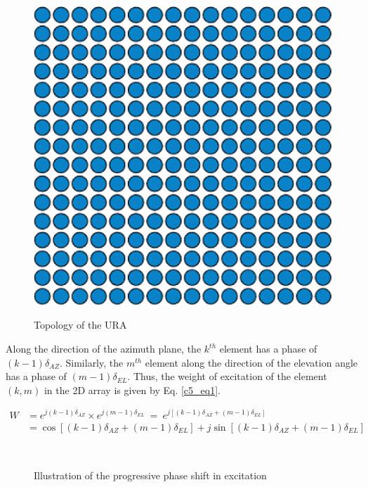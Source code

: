 \begin{figure}
  \centering
  \includegraphics[width=0.4\linewidth]{Fig-naun_1.eps}\\
  \caption{Topology of the URA} \label{fig_5_1}
\end{figure}

Along the direction of the azimuth plane, the $k^{th}$ element has a phase of $(k-1)\delta_{AZ}$. Similarly, the $m^{th}$ element along the direction of the elevation angle has a phase of $(m-1)\delta_{EL}$. Thus, the weight of excitation of the element $(k, m)$ in the 2D array is given by Eq. \ref{c5_eq1}.

\begin{equation}\label{c5_eq1}
\begin{split}
W & = e^{j(k-1)\delta_{AZ}} \times e^{j(m-1)\delta_{EL}}~=~e^{j[(k-1)\delta_{AZ} + (m-1)\delta_{EL}]} \\
  & = \cos[(k-1)\delta_{AZ} + (m-1)\delta_{EL}] + j\sin[(k-1)\delta_{AZ} + (m-1)\delta_{EL}]
\end{split}
\end{equation}

\begin{figure}
  \centering
   ~~~~
  \\
  \caption{Illustration of the progressive phase shift in excitation} \label{fig_5_2}
\end{figure}

